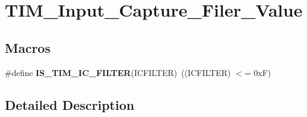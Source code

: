 \hypertarget{group___t_i_m___input___capture___filer___value}{\section{T\-I\-M\-\_\-\-Input\-\_\-\-Capture\-\_\-\-Filer\-\_\-\-Value}
\label{group___t_i_m___input___capture___filer___value}
}
\subsection*{Macros}
\begin{DoxyCompactItemize}
\item 
\hypertarget{group___t_i_m___input___capture___filer___value_ga19ecc5fc2e1ce1697c3dbbb9809ca243}{\#define {\bfseries I\-S\-\_\-\-T\-I\-M\-\_\-\-I\-C\-\_\-\-F\-I\-L\-T\-E\-R}(I\-C\-F\-I\-L\-T\-E\-R)~((I\-C\-F\-I\-L\-T\-E\-R) $<$= 0x\-F)}\label{group___t_i_m___input___capture___filer___value_ga19ecc5fc2e1ce1697c3dbbb9809ca243}

\end{DoxyCompactItemize}


\subsection{Detailed Description}
